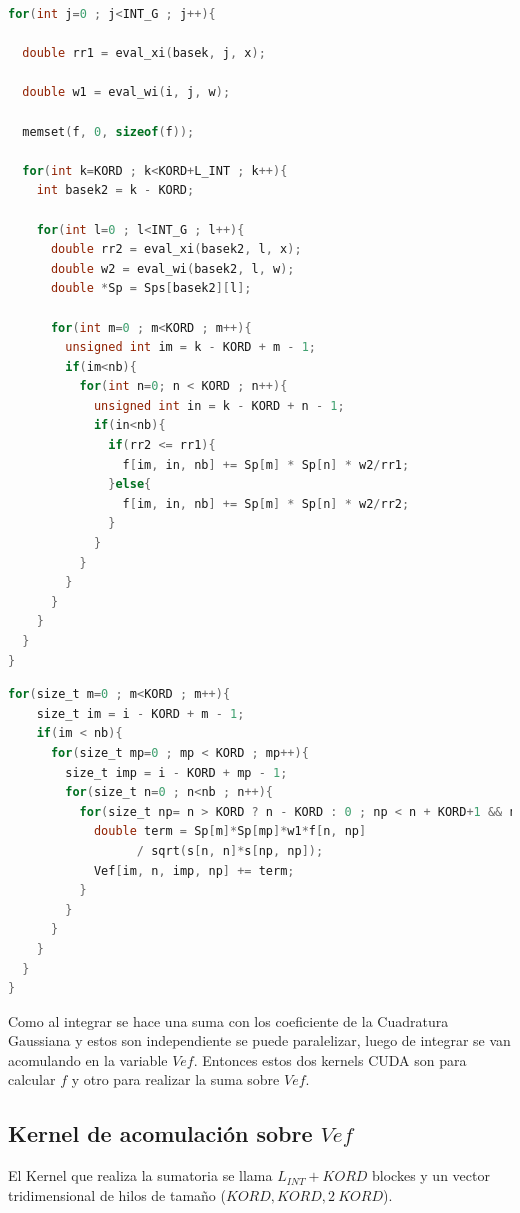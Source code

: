 \documentclass[a4paper,openright,12pt, oneside]{book}
\begin{document}
\begin{lstlisting}[language=C, caption={C\'alculo de la integral interna}, 
label=frag:f]
for(int j=0 ; j<INT_G ; j++){

  double rr1 = eval_xi(basek, j, x);
  
  double w1 = eval_wi(i, j, w);

  memset(f, 0, sizeof(f));

  for(int k=KORD ; k<KORD+L_INT ; k++){
    int basek2 = k - KORD;

    for(int l=0 ; l<INT_G ; l++){
      double rr2 = eval_xi(basek2, l, x);
      double w2 = eval_wi(basek2, l, w);
      double *Sp = Sps[basek2][l];

      for(int m=0 ; m<KORD ; m++){
        unsigned int im = k - KORD + m - 1;
        if(im<nb){
          for(int n=0; n < KORD ; n++){
            unsigned int in = k - KORD + n - 1;
            if(in<nb){
              if(rr2 <= rr1){
                f[im, in, nb] += Sp[m] * Sp[n] * w2/rr1;
              }else{
                f[im, in, nb] += Sp[m] * Sp[n] * w2/rr2;
              }
            }
          }
        }
      }
    }
  }
}
\end{lstlisting}

\begin{lstlisting}[language=C, caption={Suma sobre Vef}, 
label=frag:vef]
for(size_t m=0 ; m<KORD ; m++){
    size_t im = i - KORD + m - 1;
    if(im < nb){
      for(size_t mp=0 ; mp < KORD ; mp++){
        size_t imp = i - KORD + mp - 1;
        for(size_t n=0 ; n<nb ; n++){
          for(size_t np= n > KORD ? n - KORD : 0 ; np < n + KORD+1 && np < nb ; np++){
            double term = Sp[m]*Sp[mp]*w1*f[n, np]
                  / sqrt(s[n, n]*s[np, np]);
            Vef[im, n, imp, np] += term;
          }
        }
      }
    }
  }
}
\end{lstlisting}


Como al integrar se hace una suma con los coeficiente de la Cuadratura Gaussiana y estos son independiente se puede paralelizar, luego de integrar se van acomulando en la variable $Vef$. 
Entonces estos dos kernels CUDA son para calcular $f$ y otro para realizar la suma sobre $Vef$.

\subsection{Kernel de acomulaci\'on sobre $Vef$}

El Kernel que realiza la sumatoria se llama $L_{INT} + KORD$ blockes y un vector tridimensional de hilos de tama\~no ($KORD, KORD, 2\ KORD$).
\end{document}
